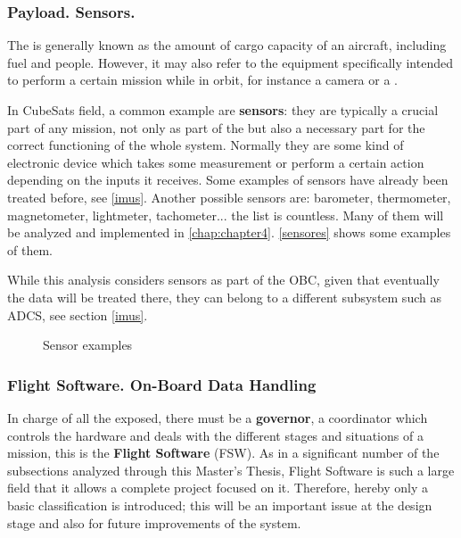 \subsubsection{Payload. Sensors.}

The  is generally known as the amount of cargo capacity of an aircraft, including fuel and people. However, it may also refer to the equipment specifically intended to perform a certain mission while in orbit, for instance a camera or a .

In CubeSats field, a common  example are \textbf{sensors}: they are typically a crucial part of any mission, not only as part of the  but also a necessary part for the correct functioning of the whole system. Normally they are some kind of electronic device which takes some measurement or perform a certain action depending on the inputs it receives. Some examples of sensors have already been treated before, see \ref{imus}. Another possible sensors are: barometer, thermometer, magnetometer, lightmeter, tachometer... the list is countless. Many of them will be analyzed and implemented in \autoref{chap:chapter4}. \autoref{sensores} shows some examples of them.

While this analysis considers sensors as part of the \acrshort{OBC}, given that eventually the data will be treated there, they can belong to a different subsystem such as \acrshort{ADCS}, see section \ref{imus}. 
			\vspace{-0.5cm}

			\begin{figure}[H]
			\centering
			 \quad
			\caption{Sensor examples \cite{hobbyking}} \label{sensores}
			\vspace{-2cm}
\end{figure}	


\subsubsection{Flight Software. On-Board Data Handling} \label{flight}

In charge of all the exposed, there must be a \textbf{governor}, a coordinator which controls the hardware and deals with the different stages and situations of a mission, this is the \textbf{Flight Software} (FSW). As in a significant number of the subsections analyzed through this Master's Thesis, Flight Software is such a large field that it allows a complete project focused on it. Therefore, hereby only a basic classification is introduced; this will be an important issue at the design stage and also for future improvements of the system.

